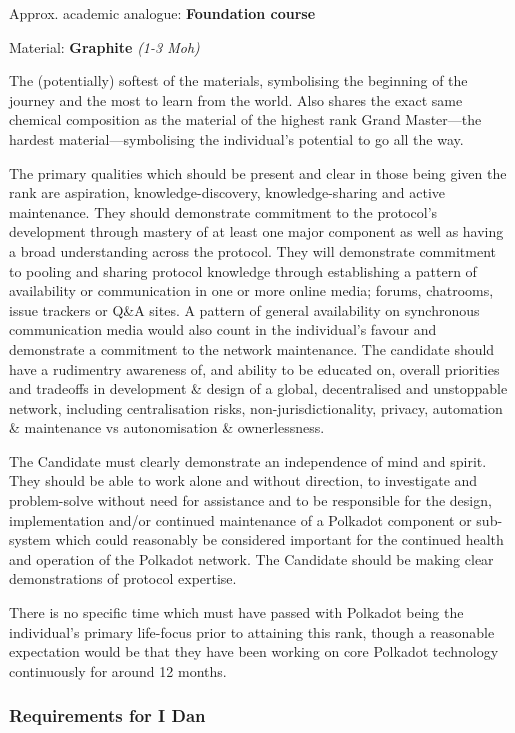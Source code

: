 \documentclass[9pt,oneside]{amsart}
\begin{document}

Approx. academic analogue: \textbf{Foundation course}

Material: \textbf{Graphite} \emph{(1-3 Moh)}

The (potentially) softest of the materials, symbolising the beginning of the journey and the most to learn from the world. Also shares the exact same chemical composition as the material of the highest rank Grand Master---the hardest material---symbolising the individual's potential to go all the way.

The primary qualities which should be present and clear in those being given the rank are aspiration, knowledge-discovery, knowledge-sharing and active maintenance. They should demonstrate commitment to the protocol's development through mastery of at least one major component as well as having a broad understanding across the protocol. They will demonstrate commitment to pooling and sharing protocol knowledge through establishing a pattern of availability or communication in one or more online media; forums, chatrooms, issue trackers or Q\&A sites. A pattern of general availability on synchronous communication media would also count in the individual's favour and demonstrate a commitment to the network maintenance. The candidate should have a rudimentry awareness of, and ability to be educated on, overall priorities and tradeoffs in development \& design of a global, decentralised and unstoppable network, including centralisation risks, non-jurisdictionality, privacy, automation \& maintenance vs autonomisation \& ownerlessness.

The Candidate must clearly demonstrate an independence of mind and spirit. They should be able to work alone and without direction, to investigate and problem-solve without need for assistance and to be responsible for the design, implementation and/or continued maintenance of a Polkadot component or sub-system which could reasonably be considered important for the continued health and operation of the Polkadot network. The Candidate should be making clear demonstrations of protocol expertise.

There is no specific time which must have passed with Polkadot being the individual's primary life-focus prior to attaining this rank, though a reasonable expectation would be that they have been working on core Polkadot technology continuously for around 12 months.

\subsubsection{Requirements for I Dan}\label{requirements-1}
\end{document}
